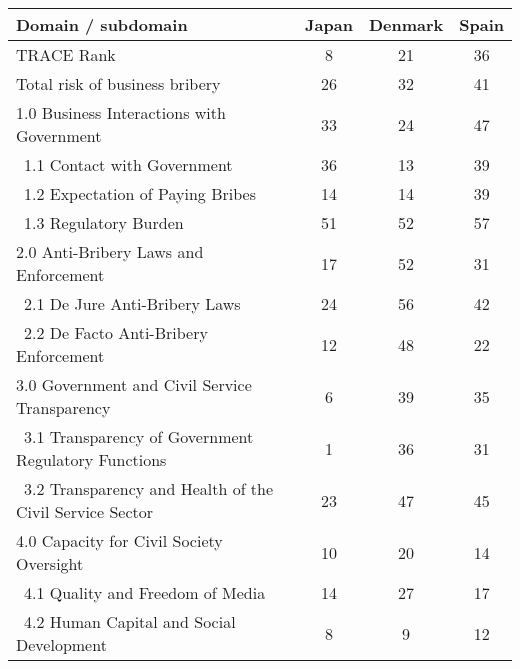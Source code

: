 \begin{tabular}{lccc}
\toprule
Domain / subdomain  & Japan & Denmark & Spain \\
\midrule
TRACE Rank                                &  8 & 21 & 36 \\
Total risk of business bribery            & 26 & 32 & 41 \\
\midrule
1.0 Business Interactions with Government & 33 & 24 & 47 \\
\ 1.1 Contact with Government             & 36 & 13 & 39 \\
\ 1.2 Expectation of Paying Bribes        & 14 & 14 & 39 \\
\ 1.3 Regulatory Burden                   & 51 & 52 & 57 \\
\midrule
2.0 Anti-Bribery Laws and Enforcement     & 17 & 52 & 31 \\
\ 2.1 De Jure Anti-Bribery Laws           & 24 & 56 & 42 \\
\ 2.2 De Facto Anti-Bribery Enforcement   & 12 & 48 & 22 \\
\midrule
3.0 Government and Civil Service Transparency             &  6 & 39 & 35 \\
\ 3.1 Transparency of Government Regulatory Functions     &  1 & 36 & 31 \\
\ 3.2 Transparency and Health of the Civil Service Sector & 23 & 47 & 45 \\
\midrule
4.0 Capacity for Civil Society Oversight  & 10 & 20 & 14 \\
\ 4.1 Quality and Freedom of Media        & 14 & 27 & 17 \\
\ 4.2 Human Capital and Social Development&  8 &  9 & 12 \\
\bottomrule
\end{tabular}
%
%
%     
